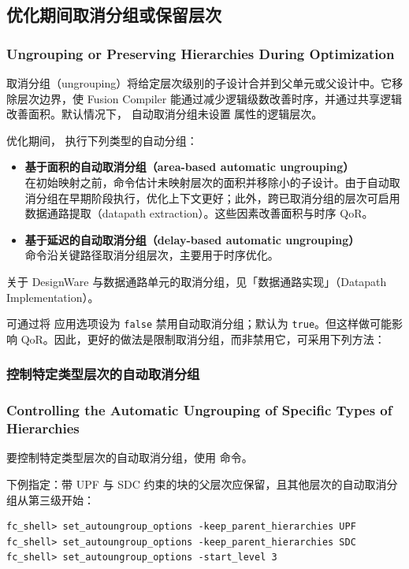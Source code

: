 \subsection{优化期间取消分组或保留层次}
\subsubsection*{Ungrouping or Preserving Hierarchies During Optimization}

取消分组（ungrouping）将给定层次级别的子设计合并到父单元或父设计中。它移除层次边界，使 Fusion Compiler 能通过减少逻辑级数改善时序，并通过共享逻辑改善面积。默认情况下， 自动取消分组未设置  属性的逻辑层次。

优化期间， 执行下列类型的自动分组：
\begin{itemize}
  \item \textbf{基于面积的自动取消分组（area-based automatic ungrouping）}\\
    在初始映射之前，命令估计未映射层次的面积并移除小的子设计。由于自动取消分组在早期阶段执行，优化上下文更好；此外，跨已取消分组的层次可启用数据通路提取（datapath extraction）。这些因素改善面积与时序 QoR。
  \item \textbf{基于延迟的自动取消分组（delay-based automatic ungrouping）}\\
    命令沿关键路径取消分组层次，主要用于时序优化。
\end{itemize}

关于 DesignWare 与数据通路单元的取消分组，见「数据通路实现」（Datapath Implementation）。

可通过将  应用选项设为 \texttt{false} 禁用自动取消分组；默认为 \texttt{true}。但这样做可能影响 QoR。因此，更好的做法是限制取消分组，而非禁用它，可采用下列方法：

\subsubsection{控制特定类型层次的自动取消分组}
\subsubsection*{Controlling the Automatic Ungrouping of Specific Types of Hierarchies}

要控制特定类型层次的自动取消分组，使用  命令。

下例指定：带 UPF 与 SDC 约束的块的父层次应保留，且其他层次的自动取消分组从第三级开始：
\begin{lstlisting}
fc_shell> set_autoungroup_options -keep_parent_hierarchies UPF
fc_shell> set_autoungroup_options -keep_parent_hierarchies SDC
fc_shell> set_autoungroup_options -start_level 3
\end{lstlisting}

